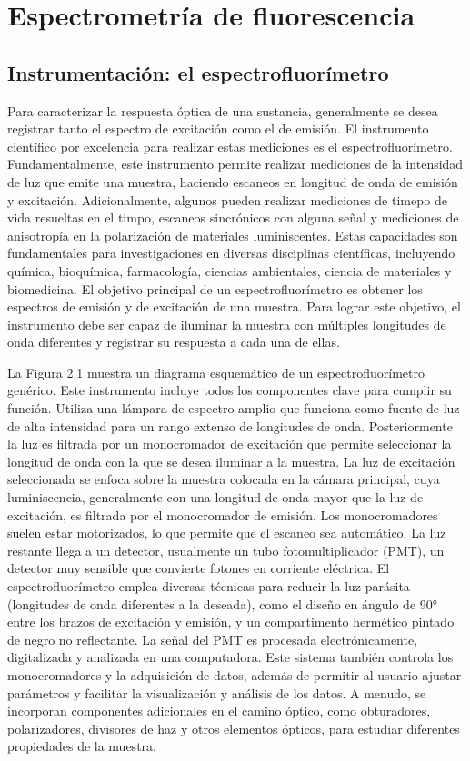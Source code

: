 
\section{Espectrometría de fluorescencia}

\subsection{Instrumentación: el espectrofluorímetro}

Para caracterizar la respuesta óptica de una sustancia, generalmente se desea registrar tanto el espectro de excitación como el de emisión. 
El instrumento científico por excelencia para realizar estas mediciones es el espectrofluorímetro. 
Fundamentalmente, este instrumento permite realizar mediciones de la intensidad de luz que emite una muestra, haciendo escaneos en longitud de onda de emisión y excitación.
Adicionalmente, algunos pueden realizar mediciones de timepo de vida resueltas en el timpo, escaneos sincrónicos con alguna señal y mediciones de anisotropía en la polarización de materiales luminiscentes.
Estas capacidades son fundamentales para investigaciones en diversas disciplinas científicas, incluyendo química, bioquímica, farmacología, ciencias ambientales, ciencia de materiales y biomedicina.
El objetivo principal de un espectrofluorímetro es obtener los espectros de emisión y de excitación de una muestra.
Para lograr este objetivo, el instrumento debe ser capaz de iluminar la muestra con múltiples longitudes de onda diferentes y registrar su respuesta a cada una de ellas.

La Figura 2.1 muestra un diagrama esquemático de un espectrofluorímetro genérico.
Este instrumento incluye todos los componentes clave para cumplir su función. 
Utiliza una lámpara de espectro amplio que funciona como fuente de luz de alta intensidad para un rango extenso de longitudes de onda. 
Posteriormente la luz es filtrada por un monocromador de excitación que permite seleccionar la longitud de onda con la que se desea iluminar a la muestra.
La luz de excitación seleccionada se enfoca sobre la muestra colocada en la cámara principal, cuya luminiscencia, generalmente con una longitud de onda mayor que la luz de excitación, es filtrada por el monocromador de emisión.
Los monocromadores suelen estar motorizados, lo que permite que el escaneo sea automático. 
La luz restante llega a un detector, usualmente un tubo fotomultiplicador (PMT), un detector muy sensible que convierte fotones en corriente eléctrica.
El espectrofluorímetro emplea diversas técnicas para reducir la luz parásita (longitudes de onda diferentes a la deseada), como el diseño en ángulo de 90° entre los brazos de excitación y emisión, y un compartimento hermético pintado de negro no reflectante.
La señal del PMT es procesada electrónicamente, digitalizada y analizada en una computadora. 
Este sistema también controla los monocromadores y la adquisición de datos, además de permitir al usuario ajustar parámetros y facilitar la visualización y análisis de los datos.
A menudo, se incorporan componentes adicionales en el camino óptico, como obturadores, polarizadores, divisores de haz y otros elementos ópticos, para estudiar diferentes propiedades de la muestra.

